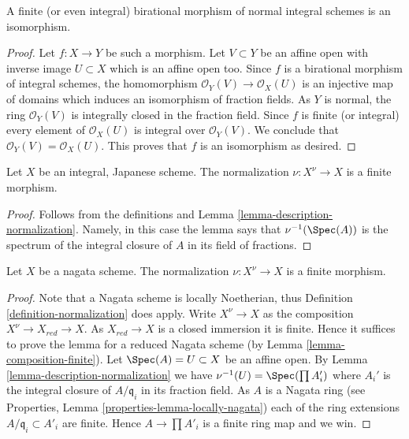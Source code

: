 \begin{lemma}
\label{lemma-finite-birational-over-normal}
A finite (or even integral) birational morphism of normal integral schemes
is an isomorphism.
\end{lemma}

\begin{proof}
Let $f : X \to Y$ be such a morphism. Let $V \subset Y$ be an affine open
with inverse image $U \subset X$ which is an affine open too.
Since $f$ is a birational morphism of integral schemes, the homomorphism
$\mathcal{O}_Y(V) \to \mathcal{O}_X(U)$ is an injective map of domains
which induces an isomorphism of fraction fields. As $Y$ is normal,
the ring $\mathcal{O}_Y(V)$ is integrally closed in the fraction field.
Since $f$ is finite (or integral) every element of $\mathcal{O}_X(U)$
is integral over $\mathcal{O}_Y(V)$. We conclude that
$\mathcal{O}_Y(V) = \mathcal{O}_X(U)$. This proves that $f$ is an
isomorphism as desired.
\end{proof}

\begin{lemma}
\label{lemma-Japanese-normalization}
Let $X$ be an integral, Japanese scheme.
The normalization $\nu : X^\nu \to X$ is a finite morphism.
\end{lemma}

\begin{proof}
Follows from the definitions and
Lemma \ref{lemma-description-normalization}. Namely, in this case
the lemma says that $\nu^{-1}(\Spec(A))$ is the spectrum
of the integral closure of $A$ in its field of fractions.
\end{proof}

\begin{lemma}
\label{lemma-nagata-normalization}
Let $X$ be a nagata scheme.
The normalization $\nu : X^\nu \to X$ is a finite morphism.
\end{lemma}

\begin{proof}
Note that a Nagata scheme is locally Noetherian, thus
Definition \ref{definition-normalization}
does apply. Write $X^\nu \to X$ as the composition
$X^\nu \to X_{red} \to X$. As $X_{red} \to X$ is a closed immersion
it is finite. Hence it suffices to prove the lemma for a reduced
Nagata scheme (by Lemma \ref{lemma-composition-finite}).
Let $\Spec(A) = U \subset X$ be an affine open.
By Lemma \ref{lemma-description-normalization} we have
$\nu^{-1}(U) = \Spec(\prod A_i')$ where $A_i'$ is the integral
closure of $A/\mathfrak q_i$ in its fraction field. As $A$ is a Nagata
ring (see Properties, Lemma \ref{properties-lemma-locally-nagata})
each of the ring extensions
$A/\mathfrak q_i \subset A'_i$ are finite. Hence $A \to \prod A'_i$
is a finite ring map and we win.
\end{proof}








